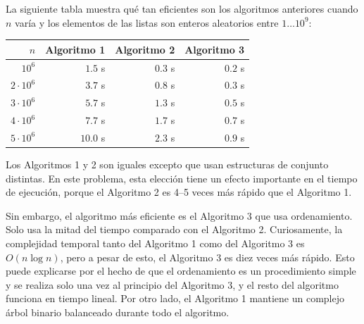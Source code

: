 La siguiente tabla muestra qué tan eficientes
son los algoritmos anteriores cuando $n$ varía y
los elementos de las listas son enteros
aleatorios entre $1 \ldots 10^9$:

\begin{center}
\begin{tabular}{rrrr}
$n$ & Algoritmo 1 & Algoritmo 2 & Algoritmo 3 \\
\hline
$10^6$ & $1.5$ s & $0.3$ s & $0.2$ s \\
$2 \cdot 10^6$ & $3.7$ s & $0.8$ s & $0.3$ s \\
$3 \cdot 10^6$ & $5.7$ s & $1.3$ s & $0.5$ s \\
$4 \cdot 10^6$ & $7.7$ s & $1.7$ s & $0.7$ s \\
$5 \cdot 10^6$ & $10.0$ s & $2.3$ s & $0.9$ s \\
\end{tabular}
\end{center}

Los Algoritmos 1 y 2 son iguales excepto que
usan estructuras de conjunto distintas.
En este problema, esta elección tiene un efecto importante en
el tiempo de ejecución, porque el Algoritmo 2
es 4–5 veces más rápido que el Algoritmo 1.

Sin embargo, el algoritmo más eficiente es el Algoritmo 3
que usa ordenamiento.
Solo usa la mitad del tiempo comparado con el Algoritmo 2.
Curiosamente, la complejidad temporal tanto del
Algoritmo 1 como del Algoritmo 3 es $O(n \log n)$,
pero a pesar de esto, el Algoritmo 3 es diez veces más rápido.
Esto puede explicarse por el hecho de que
el ordenamiento es un procedimiento simple y se realiza
solo una vez al principio del Algoritmo 3,
y el resto del algoritmo funciona en tiempo lineal.
Por otro lado,
el Algoritmo 1 mantiene un complejo árbol binario balanceado
durante todo el algoritmo.
